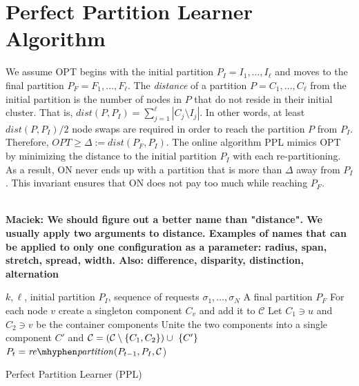 \documentclass[manuscript,screen=true]{acmart}
\newcommand{\OPT}{\mathit{OPT}}
\DeclarePairedDelimiter\set{\{}{\}}
\newcommand\maciek[1]{\color{brown}\textbf{\\ Maciek: #1}\color{black}}
\begin{document}
\section{Perfect Partition Learner Algorithm}
     
We assume OPT begins with the initial partition
$P_I = I_1, \dots, I_{\ell}$ and moves to the final partition
$P_F = F_1, \dots, F_{\ell}$.
 The \emph{distance} of a partition $P = C_1, \dots, C_{\ell}$ from the initial partition
 is the number of nodes in $P$ that do not reside in their initial cluster.
    That is,
    $\mathit{dist}(P, P_I) = \sum_{j=1}^{\ell} | C_j \setminus I_j |$. 
In other words,
at least $\mathit{dist}(P, P_I)/2$ node swaps are required in order to reach the partition $P$ from $P_I$.
Therefore,
$\OPT \geq \Delta:= dist(P_F, P_I) $.
The online algorithm PPL mimics OPT by minimizing the distance to the initial partition $P_I$ with each re-partitioning.
As a result,
ON never ends up with a partition that is more than $\Delta$ away from $P_I$.
This invariant ensures that ON does not pay too much while reaching $P_F$.

\maciek{We should figure out a better name than "distance". We usually apply two arguments to distance. Examples of names that can be applied to only one configuration as a parameter: radius, span, stretch, spread, width. Also: difference, disparity, distinction, alternation}

\begin{algorithm}
    \renewcommand{\algorithmicrequire}{\textbf{Input:}}
    \renewcommand{\algorithmicensure}{\textbf{Output:}}
    \begin{algorithmic}[1]
        \Require 
        $k, \ell$,
        initial partition $P_I$,
        sequence of  requests $\sigma_1, \dots, \sigma_N$ 
        \Ensure A final partition $P_F$ 
        \State For each node $v$ create a singleton component $C_v$ and add it to $\mathcal{C}$
         \label{line:initcomponents}
        \State Let $C_1 \ni u$ and $C_2 \ni v$ be the container components
        \State Unite the two components into a single component $C'$ and
        $\mathcal{C} = (\mathcal{C}\setminus\set{C_1, C_2}) \cup ~\set{C'}$ \label{line:mergecomponents}
        \State $P_{t} = \mathit{re\mhyphen partition}(P_{t-1}, P_I, \mathcal{C}$) \label{line:rebalance} 
        \EndIf
        \EndIf
        \EndFor
    \end{algorithmic}
    \caption{Perfect Partition Learner (PPL)}
    \label{alg:ppl}
      \end{algorithm}
  
\end{document}
